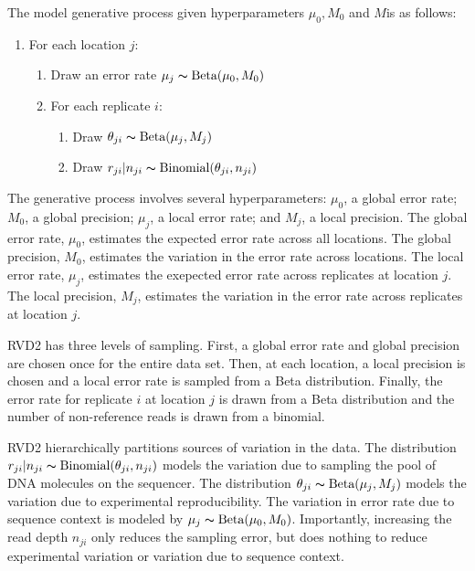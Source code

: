 \documentclass{bioinfo}
\begin{document}
The model generative process given hyperparameters $ \mu_0, M_0$ and $ M $is as follows:

\begin{enumerate}[noitemsep]
	\item For each location $j$:
	\begin{enumerate}[noitemsep]
		\item Draw an error rate $\mu_j \thicksim \text{Beta}(\mu_0, M_0)$
		\item For each replicate $i$:
		\begin{enumerate}
			\item Draw $\theta_{ji} \thicksim \text{Beta}(\mu_j, M_j)$
			\item Draw $r_{ji}|n_{ji} \thicksim \text{Binomial}(\theta_{ji}, n_{ji})$
		\end{enumerate}
	\end{enumerate}
\end{enumerate}

The generative process involves several hyperparameters: $\mu_0$, a global error rate; $M_0$, a global precision;  $ \mu_j $, a local error rate; and $M_j$, a local precision. The global error rate, $\mu_0$, estimates the expected error rate across all locations. The global precision, $M_0$, estimates the variation in the error rate  across locations. The local error rate, $ \mu_j $, estimates the exepected error rate across replicates at location $ j $. The local precision, $M_j$, estimates the variation in the error rate across replicates at location $j$.

RVD2 has three levels of sampling. First, a global error rate and global precision are chosen once for the entire data set. Then, at each location, a local precision is chosen and a local error rate is sampled from a Beta distribution. Finally, the error rate for replicate $i$ at location $j$ is drawn from a Beta distribution and the number of non-reference reads is drawn from a binomial.

RVD2 hierarchically partitions sources of variation in the data. The distribution $r_{ji} | n_{ji} \thicksim \text{Binomial}(\theta_{ji}, n_{ji})$ models the variation due to sampling the pool of DNA molecules on the sequencer. The distribution $\theta_{ji} \thicksim \text{Beta}(\mu_j, M_j)$ models the variation due to experimental reproducibility. The variation in error rate due to sequence context is modeled by $\mu_j \thicksim \text{Beta}(\mu_0, M_0)$. Importantly, increasing the read depth $n_{ji}$ only reduces the sampling error, but does nothing to reduce experimental variation or variation due to sequence context.
\end{document}
